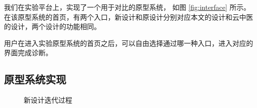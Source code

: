 我们在实验平台上，实现了一个用于对比的原型系统， 如图  \ref{fig:interface} 所示。在该原型系统的首页，有两个入口，新设计和原设计分别对应本文的设计和云中医的设计，两个设计的功能相同。

用户在进入实验原型系统的首页之后，可以自由选择通过哪一种入口，进入对应的界面完成诊断。

\subsection{原型系统实现}

\begin{figure}[h]
    \centering
    \caption{新设计迭代过程}
    \label{fig:diag_new}
\end{figure}

